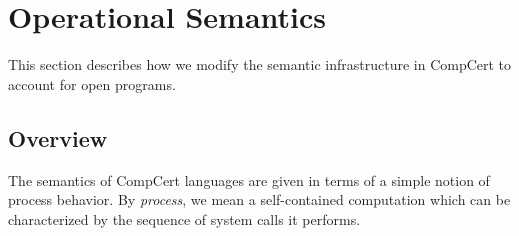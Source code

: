 \documentclass[sigplan,10pt,review,anonymous]{acmart}\settopmatter{printfolios=true,printccs=false,printacmref=false}
\begin{document}




\section{Operational Semantics} \label{sec:sem} %

This section describes how we modify
the semantic infrastructure in CompCert
to account for open programs.


\subsection{Overview} \label{sec:sem:overview} %

The semantics of CompCert languages
are given in terms of a simple notion of process behavior.
By \emph{process}, we mean a self-contained computation
which can be characterized by
the sequence of system calls it performs.
\end{document}
